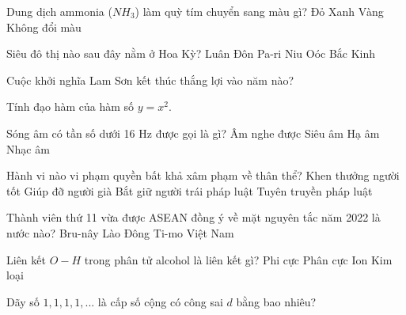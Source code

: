 \begin{ex}
    Dung dịch ammonia ($NH_3$) làm quỳ tím chuyển sang màu gì?
    \choice
    {Đỏ}
    {\True Xanh}
    {Vàng}
    {Không đổi màu}
\end{ex}
\begin{ex}
    Siêu đô thị nào sau đây nằm ở Hoa Kỳ?
    \choice
    {Luân Đôn}
    {Pa-ri}
    {\True Niu Oóc}
    {Bắc Kinh}
\end{ex}
\begin{ex}
    Cuộc khởi nghĩa Lam Sơn kết thúc thắng lợi vào năm nào?
\end{ex}
\begin{ex}
    Tính đạo hàm của hàm số $y = x^2$.
\end{ex}
\begin{ex}
    Sóng âm có tần số dưới 16 Hz được gọi là gì?
    \choice
    {Âm nghe được}
    {Siêu âm}
    {\True Hạ âm}
    {Nhạc âm}
\end{ex}
\begin{ex}
    Hành vi nào vi phạm quyền bất khả xâm phạm về thân thể?
    \choice
    {Khen thưởng người tốt}
    {Giúp đỡ người già}
    {\True Bắt giữ người trái pháp luật}
    {Tuyên truyền pháp luật}
\end{ex}
\begin{ex}
    Thành viên thứ 11 vừa được ASEAN đồng ý về mặt nguyên tắc năm 2022 là nước nào?
    \choice
    {Bru-nây}
    {Lào}
    {\True Đông Ti-mo}
    {Việt Nam}
\end{ex}
\begin{ex}
    Liên kết $O-H$ trong phân tử alcohol là liên kết gì?
    \choice
    {Phi cực}
    {\True Phân cực}
    {Ion}
    {Kim loại}
\end{ex}
\begin{ex}
    Dãy số $1, 1, 1, 1, ...$ là cấp số cộng có công sai $d$ bằng bao nhiêu?
\end{ex}
